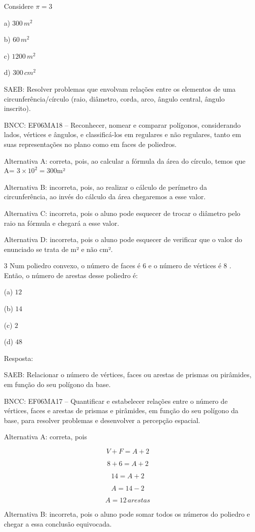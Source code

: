 Considere $π = 3$

a) $300\,m^2$

b) $60\,m^2$

c) $1200\,m^2$

d) $300\,cm^2$

SAEB: Resolver problemas que envolvam relações entre os elementos de uma
circunferência/círculo (raio, diâmetro, corda, arco, ângulo central,
ângulo inscrito).

BNCC: EF06MA18 -- Reconhecer, nomear e comparar polígonos, considerando
lados, vértices e ângulos, e classificá-los em regulares e não
regulares, tanto em suas representações no plano como em faces de
poliedros.

Alternativa A: correta, pois, ao calcular a fórmula da área do círculo,
temos que A= $3\times 10^2 = 300$m²

Alternativa B: incorreta, pois, ao realizar o cálculo de perímetro da
circunferência, ao invés do cálculo da área chegaremos a esse valor.

Alternativa C: incorreta, pois o aluno pode esquecer de trocar o
diâmetro pelo raio na fórmula e chegará a esse valor.

Alternativa D: incorreta, pois o aluno pode esquecer de verificar que o
valor do enunciado se trata de m² e não cm².

\num{3}  Num poliedro convexo, o número de faces é $6$ e o número de vértices é
8 . Então, o número de arestas desse poliedro é:

(a) $12$

(b) $14$

(c) $2$

(d) $48$

Resposta:

SAEB: Relacionar o número de vértices, faces ou arestas de prismas ou
pirâmides, em função do seu polígono da base.

BNCC: EF06MA17 -- Quantificar e estabelecer relações entre o número de
vértices, faces e arestas de prismas e pirâmides, em função do seu
polígono da base, para resolver problemas e desenvolver a percepção
espacial.

Alternativa A: correta, pois

$$V + F = A + 2$$

$$8 + 6 = A + 2$$

$$14 = A + 2$$

$$A = 14 - 2$$

$$A = 12\,arestas$$

Alternativa B: incorreta, pois o aluno pode somar todos os números do
poliedro e chegar a essa conclusão equivocada.

